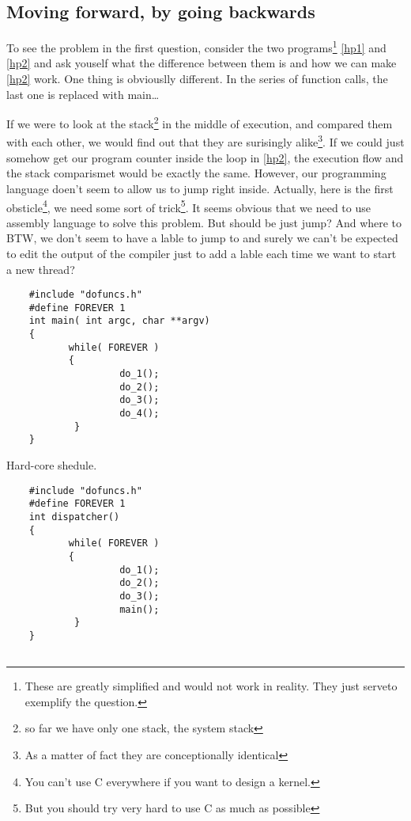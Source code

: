 {		
	\subsection{Moving forward, by going backwards}
		To see the problem in the first question, consider the two programs\footnote{These are greatly simplified and would not work in reality. They just serveto exemplify the question.} \ref{hp1} and \ref{hp2} and ask youself what the difference between them is and how we can make \ref{hp2} work. One thing is obviouslly different. In the series of function calls, the last one is replaced with main\ldots

		If we were to look at the stack\footnote{so far we have only one stack, the system stack} in the middle of execution, and compared them with each other, we would find out that they are surisingly alike\footnote{As a matter of fact they are conceptionally identical}. If we could just somehow get our program counter inside the loop in \ref{hp2}, the execution flow and the stack comparismet would be exactly the same. However, our programming language doen't seem to allow us to jump right inside. Actually, here is the first obsticle\footnote{You can't use C everywhere if you want to design a kernel.}, we need some sort of trick\footnote{But you should try very hard to use C as much as possible}. It seems obvious that we need to use assembly language to solve this problem. But should be just jump? And where to BTW, we don't seem to have a lable to jump to and surely we can't be expected to edit the output of the compiler just to add a lable each time we want to start a new thread?

	\begin{table}[!hbp]
	\begin{verbatim}
	#include "dofuncs.h"
	#define FOREVER 1
	int main( int argc, char **argv)
	{ 
	       while( FOREVER )
	       {
	                do_1();
	                do_2();
	                do_3();
	                do_4();
	        }
	}
	\end{verbatim}
	\caption{Hard-core shedule.\label{hp1}}
	\end{table}

	\begin{table}[!hbp]
	\begin{verbatim}
	#include "dofuncs.h"
	#define FOREVER 1
	int dispatcher()
	{ 
	       while( FOREVER )
	       {
	                do_1();
	                do_2();
	                do_3();
	                main();
	        }
	}


\end{verbatim}
\end{table}}
